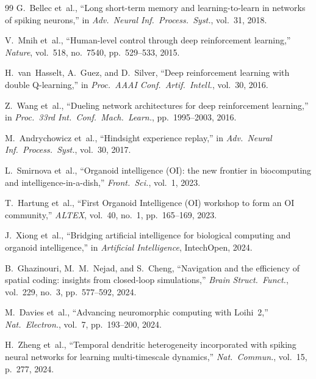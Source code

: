 \documentclass[journal,twocolumn]{IEEEtran}
\begin{document}
\begin{thebibliography}{99}
G.~Bellec et~al., ``Long short-term memory and learning-to-learn in
networks of spiking neurons,'' in \emph{Adv.\ Neural Inf.\ Process.\
Syst.}, vol.~31, 2018.

V.~Mnih et~al., ``Human-level control through deep reinforcement
learning,'' \emph{Nature}, vol.~518, no.~7540, pp.~529--533, 2015.

H.~van~Hasselt, A.~Guez, and D.~Silver, ``Deep reinforcement learning
with double Q-learning,'' in \emph{Proc.\ AAAI Conf.\ Artif.\ Intell.},
vol.~30, 2016.

Z.~Wang et~al., ``Dueling network architectures for deep reinforcement
learning,'' in \emph{Proc.\ 33rd Int.\ Conf.\ Mach.\ Learn.},
pp.~1995--2003, 2016.

M.~Andrychowicz et~al., ``Hindsight experience replay,'' in
\emph{Adv.\ Neural Inf.\ Process.\ Syst.}, vol.~30, 2017.

L.~Smirnova et~al., ``Organoid intelligence (OI): the new frontier in
biocomputing and intelligence-in-a-dish,'' \emph{Front.\ Sci.},
vol.~1, 2023.

T.~Hartung et~al., ``First Organoid Intelligence (OI) workshop to
form an OI community,'' \emph{ALTEX}, vol.~40, no.~1,
pp.~165--169, 2023.

J.~Xiong et~al., ``Bridging artificial intelligence for biological
computing and organoid intelligence,'' in \emph{Artificial
Intelligence}, IntechOpen, 2024.

B.~Ghazinouri, M.~M.~Nejad, and S.~Cheng, ``Navigation and the
efficiency of spatial coding: insights from closed-loop simulations,''
\emph{Brain Struct.\ Funct.}, vol.~229, no.~3, pp.~577--592, 2024.

M.~Davies et~al., ``Advancing neuromorphic computing with Loihi~2,''
\emph{Nat.\ Electron.}, vol.~7, pp.~193--200, 2024.

H.~Zheng et~al., ``Temporal dendritic heterogeneity incorporated with
spiking neural networks for learning multi-timescale dynamics,''
\emph{Nat.\ Commun.}, vol.~15, p.~277, 2024.

\end{thebibliography}
\end{document}
